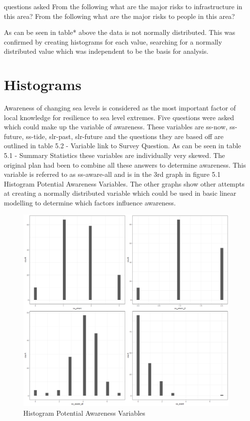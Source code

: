 questions asked From the following what are the major risks to infrastructure in this area?
From the following what are the major risks to people in this area?

As can be seen in table* above the data is not normally distributed. This was confirmed by creating histograms for each value, searching for a normally distributed value which was independent to be the basis for analysis. 

\section{Histograms}
Awareness of changing sea levels is considered as the most important factor of local knowledge for resilience to sea level extremes. Five questions were asked which could make up the variable of awareness. These variables are ss-now, ss-future, ss-tide, slr-past, slr-future and the questions they are based off are outlined in table 5.2 - Variable link to Survey Question. As can be seen in table 5.1 - Summary Statistics these variables are individually very skewed. The original plan had been to combine all these answers to determine awareness. This variable is referred to as ss-aware-all and is in the 3rd graph in figure 5.1 Histogram Potential Awareness Variables. The other graphs show other attempts at creating a normally distributed variable which could be used in basic linear modelling to determine which factors influence awareness.

\begin{figure}[h]
    \centering
    \includegraphics[width=1\textwidth]{fig_results/Awareness.png}
    \caption{Histogram Potential Awareness Variables}
    \label{fig:aware}
\end{figure}

